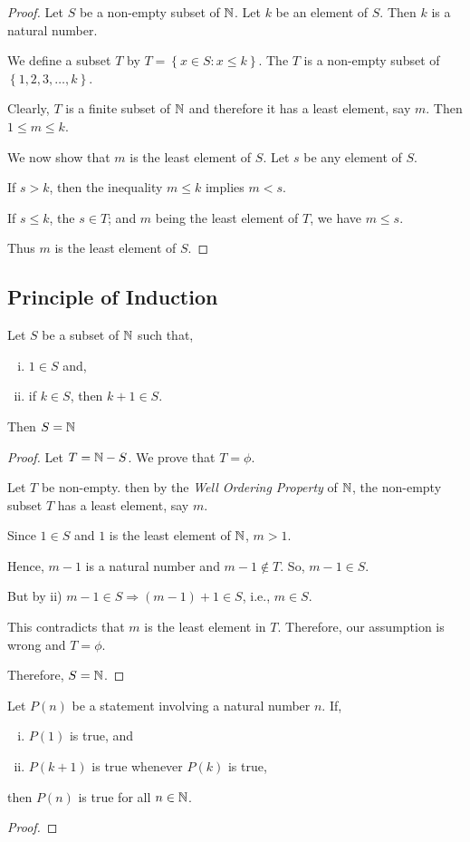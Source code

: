 \documentclass[11pt]{scrartcl}
\begin{document}
		\begin{proof}
			Let $S$ be a non-empty subset of $\mathbb N$. Let $k$ be an element of $S$. Then $k$ is a natural number.
			
			We define a subset $T$ by $T = \left\{ x \in S : x \leq k \right\}$. The $T$ is a non-empty subset of $\left\{ 1,2,3,\dots, k \right\}$.
			
			Clearly, $T$ is a finite subset of $\mathbb N$ and therefore it has a least element, say $m$. Then $1 \leq m \leq k$.
			
			We now show that $m$ is the least element of $S$. Let $s$ be any element of $S$.
			
			If $s>k$, then the inequality $m \leq k$ implies $m<s$.
			
			If $s \leq k$, the $s \in T$; and $m$ being the least element of $T$, we have $m \leq s$.
			
			Thus $m$ is the least element of $S$.
		\end{proof}
	
	\subsection{Principle of Induction}
	\begin{definition}
		Let $S$ be a subset of $\mathbb N$ such that,
		\begin{enumerate}[i)]
			\item  $1 \in S$ and,
			\item  if $k \in S$, then $k+1 \in S$.
		\end{enumerate}
	Then $S = \mathbb N$
	\end{definition}
	
	\begin{proof}
		Let $T = \mathbb N - S$. We prove that $T = \phi$.
		
		Let $T$ be non-empty. then by the \emph{Well Ordering Property} of $\mathbb N$, the non-empty subset $T$ has a least element, say $m$.
		
		Since $1 \in S$ and $1$ is the least element of $\mathbb N$, $m>1$.
		
		Hence, $m-1$ is a natural number and $m-1 \notin T$. So, $m-1 \in S$.
		
		But by ii) $m-1 \in S \Rightarrow (m-1)+1 \in S$, i.e., $m \in S$.
		
		This contradicts that $m$ is the least element in $T$. Therefore, our assumption is wrong and $T = \phi$.
		
		Therefore, $S=\mathbb N$.
	\end{proof}
		 
	\begin{theorem}
		Let $P(n)$ be a statement involving a natural number $n$. If,
		\begin{enumerate}[i)]
			\item $P(1)$ is true, and
			\item $P(k+1)$ is true whenever $P(k)$ is true,
		\end{enumerate}
		then $P(n)$ is true for all $n \in \mathbb N$.
	\end{theorem}

	\begin{proof}
		
	\end{proof}
\end{document}
